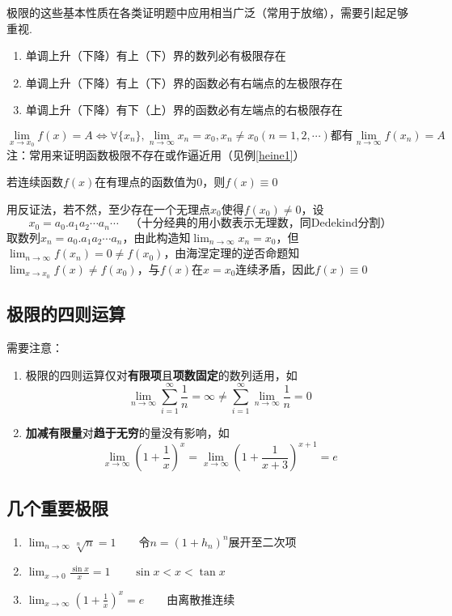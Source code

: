 极限的这些基本性质在各类证明题中应用相当广泛（常用于放缩），需要引起足够重视.
\begin{theorem}[单调有界原理]\mbox{}\par%
\begin{enumerate}
	\item 单调上升（下降）有上（下）界的数列必有极限存在
	\item 单调上升（下降）有上（下）界的函数必有右端点的左极限存在
	\item 单调上升（下降）有下（上）界的函数必有左端点的右极限存在
\end{enumerate}
\end{theorem}
\begin{theorem}[海涅(Heine)定理]
\[\lim_{x\to x_0}f(x)=A\iff\forall\{x_n\},\lim_{n\to\infty}x_n=x_0,x_n\ne x_0(n=1,2,\cdots)\text{都有}\lim_{n\to \infty}f(x_n)=A\]
注：常用来证明函数极限不存在或作逼近用（见例\ref{heine1}）
\end{theorem}
\begin{example}
\label{heine1}
若连续函数$f(x)$在有理点的函数值为$0$，则$f(x)\equiv 0$
\end{example}
\begin{analysis}
用反证法，若不然，至少存在一个无理点$x_0$使得$f(x_0)\ne 0$，设
\[x_0=a_0.a_1a_2\cdots a_n\cdots\quad\text{（十分经典的用小数表示无理数，同Dedekind分割）}\]
取数列$x_n=a_0.a_1a_2\cdots a_n$，由此构造知$\displaystyle\lim_{n\to\infty}x_n=x_0$，但$\displaystyle\lim_{n\to\infty}f(x_n)=0\ne f(x_0)$，由海涅定理的逆否命题知$\displaystyle\lim_{x\to x_0}f(x)\ne f(x_0)$，与$f(x)$在$x=x_0$连续矛盾，因此$f(x)\equiv 0$
\end{analysis}

\subsection{极限的四则运算}
需要注意：
\begin{enumerate}
	\item 极限的四则运算仅对\textbf{有限项}且\textbf{项数固定}的数列适用，如
	\[\displaystyle\lim_{n\to\infty}\sum_{i=1}^\infty\frac{1}{n}=\infty\ne \sum_{i=1}^\infty\lim_{n\to\infty}\frac{1}{n}=0\]
	\item \textbf{加减有限量}对\textbf{趋于无穷}的量没有影响，如
	\[\lim_{x\to\infty}(1+\frac{1}{x})^x=\lim_{x\to\infty}(1+\frac{1}{x+3})^{x+1}=e\]
\end{enumerate}

\subsection{几个重要极限}
\begin{enumerate}
	\item $\displaystyle\lim_{n\to\infty}\sqrt[n]{n}=1\qquad$令$n=(1+h_n)^n$展开至二次项
	\item $\displaystyle\lim_{x\to 0}\frac{\sin x}{x}=1\qquad\sin x<x<\tan x$
	\item $\displaystyle\lim_{x\to\infty}\left(1+\frac{1}{x}\right)^x=e\qquad$由离散推连续
\end{enumerate}

